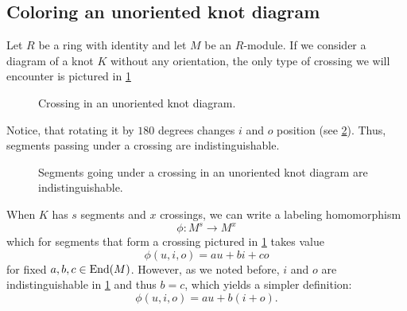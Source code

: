 \subsection{Coloring an unoriented knot diagram}

Let $R$ be a ring with identity and let $M$ be an $R$-module. If we consider a diagram of a knot $K$ without any orientation, the only type of crossing we will encounter is pictured in \cref{fig.1:unoriented:crossing}

\begin{figure}[h] \centering 
  \caption{\label{fig.1:unoriented:crossing}Crossing in an unoriented knot diagram.}
\end{figure}

Notice, that rotating it by $180$ degrees changes $i$ and $o$ position (see \cref{fig.2:unoriented:crossing:floped}). Thus, segments passing under a crossing are indistinguishable. 

\begin{figure}[h] \centering 
  \caption{\label{fig.2:unoriented:crossing:floped}Segments going under a crossing in an unoriented knot diagram are indistinguishable.}
\end{figure}

When $K$ has $s$ segments and $x$ crossings, we can write a labeling homomorphism
$$\phi:M^s\to M^x$$
which for segments that form a crossing pictured in \cref{fig.1:unoriented:crossing} takes value
$$\phi(u, i, o)=au+bi+co$$
for fixed $a,b,c\in\operatorname{End}(M)$. However, as we noted before, $i$ and $o$ are indistinguishable in \cref{fig.1:unoriented:crossing} and thus $b=c$, which yields a simpler definition:
$$\phi(u,i,o)=au+b(i+o).$$

